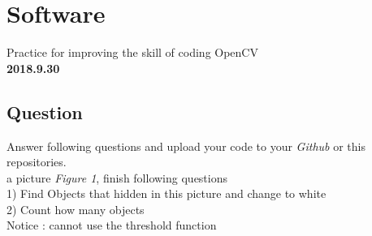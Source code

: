 \section*{Software}

Practice for improving the skill of coding OpenCV\\

\textbf{2018.9.30}

\subsection*{Question}

Answer following questions and upload your code to your \emph{Github} or this repositories.\\

 a picture \emph{Figure 1}, finish following questions\\

1) Find Objects that hidden in this picture and change to white\\

2) Count how many objects\\

\noindent\textsf{Notice} : cannot use the threshold function
\clearpage